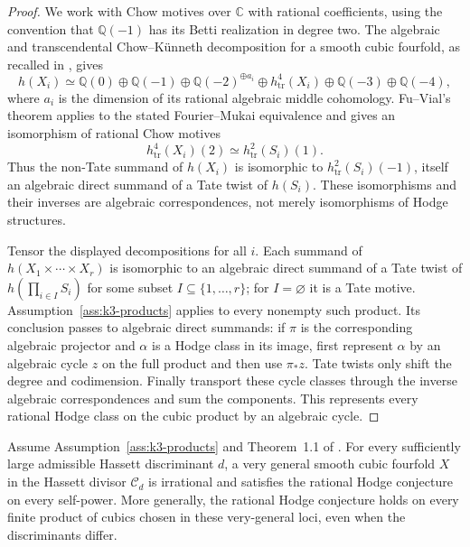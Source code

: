 \begin{proof}
We work with Chow motives over $\mathbb C$ with rational coefficients, using
the convention that $\mathbb Q(-1)$ has its Betti realization in degree two.
The algebraic and transcendental Chow--K\"unneth decomposition for a smooth
cubic fourfold, as recalled in \cite[\S5.2]{fuvial}, gives
\[
 h(X_i)\simeq
 \mathbb Q(0)\oplus\mathbb Q(-1)
 \oplus\mathbb Q(-2)^{\oplus a_i}
 \oplus h^4_{\mathrm{tr}}(X_i)
 \oplus\mathbb Q(-3)\oplus\mathbb Q(-4),
\]
where $a_i$ is the dimension of its rational algebraic middle cohomology.
Fu--Vial's theorem \cite[Theorem~3, equivalently Theorem~7.2]{fuvial}
applies to the stated Fourier--Mukai equivalence and gives an isomorphism
of rational Chow motives
\[
 h^4_{\mathrm{tr}}(X_i)(2)
       \simeq h^2_{\mathrm{tr}}(S_i)(1).
\]
Thus the non-Tate summand of $h(X_i)$ is isomorphic to
$h^2_{\mathrm{tr}}(S_i)(-1)$, itself an algebraic direct summand of a Tate
twist of $h(S_i)$.  These isomorphisms and their inverses are algebraic
correspondences, not merely isomorphisms of Hodge structures.

Tensor the displayed decompositions for all $i$.  Each summand of
$h(X_1\times\cdots\times X_r)$ is isomorphic to an algebraic direct
summand of a Tate twist of $h(\prod_{i\in I}S_i)$ for some subset
$I\subseteq\{1,\ldots,r\}$; for $I=\varnothing$ it is a Tate motive.
Assumption~\ref{ass:k3-products} applies to every nonempty such product.
Its conclusion passes to algebraic direct summands: if $\pi$ is the
corresponding algebraic projector and $\alpha$ is a Hodge class in its
image, first represent $\alpha$ by an algebraic cycle $z$ on the full
product and then use $\pi_*z$.  Tate twists only shift the degree and
codimension.  Finally transport these cycle classes through the inverse
algebraic correspondences and sum the components.  This represents every
rational Hodge class on the cubic product by an algebraic cycle.
\end{proof}

\begin{proposition}
\label{prop:irrational-cubics}
Assume Assumption~\ref{ass:k3-products} and Theorem~1.1 of \cite{cubic}.
For every sufficiently large admissible Hassett discriminant $d$, a very
general smooth cubic fourfold $X$ in the Hassett divisor $\mathcal C_d$
is irrational and satisfies the rational Hodge conjecture on every
self-power.  More generally, the rational Hodge conjecture holds on every
finite product of cubics chosen in these very-general loci, even when the
discriminants differ.
\end{proposition}

